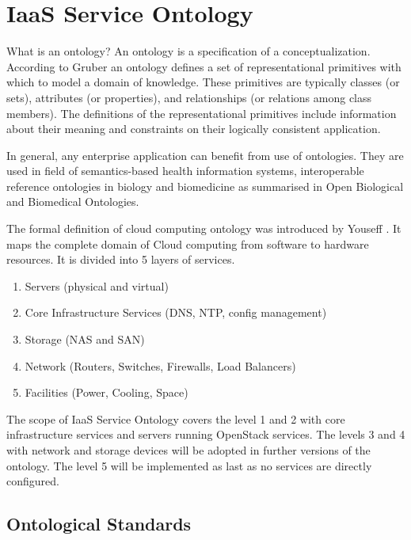 
\section{IaaS Service Ontology}
\label{chap:ontology}

What is an ontology? An ontology is a specification of a conceptualization. According to Gruber \cite{OntologyDefinition} an ontology defines a set of representational primitives with which to model a domain of knowledge. These  primitives are typically classes (or sets), attributes (or properties), and relationships (or relations among class members). The definitions of the representational primitives include information about their meaning and constraints on their logically consistent application.



In general, any enterprise application can benefit from use of ontologies. They are used in field of semantics-based health information systems, interoperable reference ontologies in biology and biomedicine as summarised in Open Biological and Biomedical Ontologies\cite{OBO}.

The formal definition of cloud computing ontology was introduced by Youseff \cite{OntologyComputing}. It maps the complete domain of Cloud computing from software to hardware resources. It is divided into 5 layers of services.

\begin{enumerate}
 \item Servers (physical and virtual)
 \item Core Infrastructure Services (DNS, NTP, config management) 
 \item Storage (NAS and SAN)
 \item Network (Routers, Switches, Firewalls, Load Balancers)
 \item Facilities (Power, Cooling, Space)
\end{enumerate}

The scope of IaaS Service Ontology covers the level 1 and 2 with core infrastructure services and servers running OpenStack services. The levels 3 and 4 with network and storage devices will be adopted in further versions of the ontology. The level 5 will be implemented as last as no services are directly configured.

\subsection{Ontological Standards}

